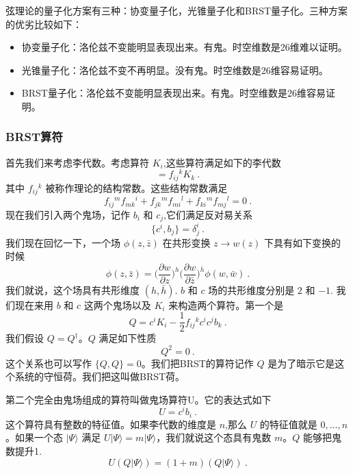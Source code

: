
弦理论的量子化方案有三种：协变量子化，光锥量子化和BRST量子化。三种方案的优劣比较如下：
\begin{itemize}
\item 协变量子化：洛伦兹不变能明显表现出来。有鬼。时空维数是26维难以证明。
\item 光锥量子化：洛伦兹不变不再明显。没有鬼。时空维数是26维容易证明。
\item BRST量子化：洛伦兹不变能明显表现出来。有鬼。时空维数是26维容易证明。
\end{itemize}
\subsubsection{BRST算符}
首先我们来考虑李代数。考虑算符 $K_i$,这些算符满足如下的李代数
\begin{equation}
[K_i,K_j] = f_{ij}{}^k K_k~.
\end{equation}
其中 $f_{ij}{}^k$ 被称作理论的结构常数。这些结构常数满足
\begin{equation}
f_{ij}{}^m f_{mk}{}^i + f_{jk}{}^m f_{mi}{}^l+f_{ki}{}^m f_{mj}{}^l = 0 ~. 
\end{equation}
现在我们引入两个鬼场，记作 $b_i$ 和 $c_j$,它们满足反对易关系
\begin{equation}\label{eq_BRST_5}
\{ c^i, b_j \} = \delta^i_j~.
\end{equation}
我们现在回忆一下，一个场 $\phi(z,\bar z)$ 在共形变换 $z\rightarrow w(z)$ 下具有如下变换的时候
\begin{equation}
\phi(z,\bar z) = \bigg( \frac{\partial w}{\partial z} \bigg)^h \bigg( \frac{\partial w}{\partial \bar z} \bigg)^{\bar h} \phi (w,\bar w)~.
\end{equation}
我们就说，这个场具有共形维度 $(h,\bar h)$. $b$ 和 $c$ 场的共形维度分别是 $2$ 和 $-1$. 我们现在来用 $b$ 和 $c$ 这两个鬼场以及 $K_i$ 来构造两个算符。第一个是
\begin{equation}
Q = c^i K_i - \frac{1}{2} f_{ij}{}^k c^i c^j b_k~.
\end{equation}
我们假设 $Q = Q^\dagger$。$Q$ 满足如下性质
\begin{equation}
Q^2 = 0~.
\end{equation}
这个关系也可以写作 $\{Q,Q\}=0$。我们把BRST的算符记作 $Q$ 是为了暗示它是这个系统的守恒荷。我们把这叫做BRST荷。

第二个完全由鬼场组成的算符叫做鬼场算符U。它的表达式如下
\begin{equation}\label{eq_BRST_1}
U = c^i b_i~.
\end{equation}
这个算符具有整数的特征值。如果李代数的维度是 $n$,那么 $U$ 的特征值就是 $0,\ldots ,n$。如果一个态 $|\Psi\rangle$ 满足 $U|\Psi\rangle=m|\Psi\rangle$，我们就说这个态具有鬼数 $m$。$Q$ 能够把鬼数提升1.
\begin{equation}
U (Q|\Psi\rangle) = (1+m) (Q|\Psi\rangle)~. 
\end{equation}
